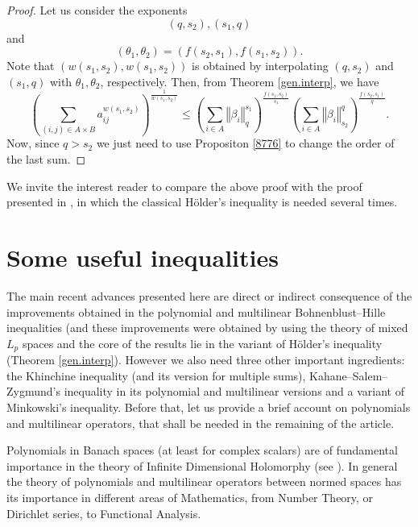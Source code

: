\documentclass[10pt]{amsart}
\numberwithin{equation}{section}
\begin{document}
\begin{proof}
Let us consider the exponents
\begin{equation*}
\left( q,s_{2}\right) ,\left( s_{1},q\right)
\end{equation*}and
\begin{equation*}
\left( \theta _{1},\theta _{2}\right) =\left(
f(s_{2},s_{1}),f(s_{1},s_{2})\right) .
\end{equation*}Note that $(w\left( s_{1},s_{2}\right) ,w\left( s_{1},s_{2}\right) )$ is
obtained by interpolating $\left( q,s_{2}\right) $ and $\left(
s_{1},q\right) $ with $\theta _{1},\theta _{2}$, respectively. Then, from
Theorem \ref{gen.interp}, we have
\begin{equation*}
\left( \sum_{(i,j)\in A\times B}a_{ij}^{w(s_{1},s_{2})}\right) ^{\frac{1}{w(s_{1},s_{2})}}\leq \left( \sum_{i\in A}\left\Vert \beta _{i}\right\Vert
_{q}^{s_{1}}\right) ^{\frac{f(s_{1},s_{2})}{s_{1}}}\left( \sum_{i\in
A}\left\Vert \beta _{i}\right\Vert _{s_{2}}^{q}\right) ^{\frac{f(s_{2},s_{1})}{q}}.
\end{equation*}Now, since $q>s_{2}$ we just need to use Propositon \ref{8776} to change the
order of the last sum.
\end{proof}

We invite the interest reader to compare the above proof with the proof
presented in \cite[pages 226-227]{defa}, in which the classical H\"{o}lder's
inequality is needed several times.

\section{Some useful inequalities\label{445}}

The main recent advances presented here are direct or indirect consequence
of the improvements obtained in the polynomial and multilinear
Bohnenblust--Hille inequalities (and these improvements were obtained by
using the theory of mixed $L_{p}$ spaces and the core of the results lie in
the variant of H\"{o}lder's inequality (Theorem \ref{gen.interp}). However
we also need three other important ingredients: the Khinchine inequality
(and its version for multiple sums), Kahane--Salem--Zygmund's inequality in
its polynomial and multilinear versions and a variant of Minkowski's
inequality. Before that, let us provide a brief account on polynomials and
multilinear operators, that shall be needed in the remaining of the article.

Polynomials in Banach spaces (at least for complex scalars) are of
fundamental importance in the theory of Infinite Dimensional Holomorphy (see
\cite{dineen, mujica}). In general the theory of polynomials and multilinear
operators between normed spaces has its importance in different areas of
Mathematics, from Number Theory, or Dirichlet series, to Functional Analysis.
\end{document}
